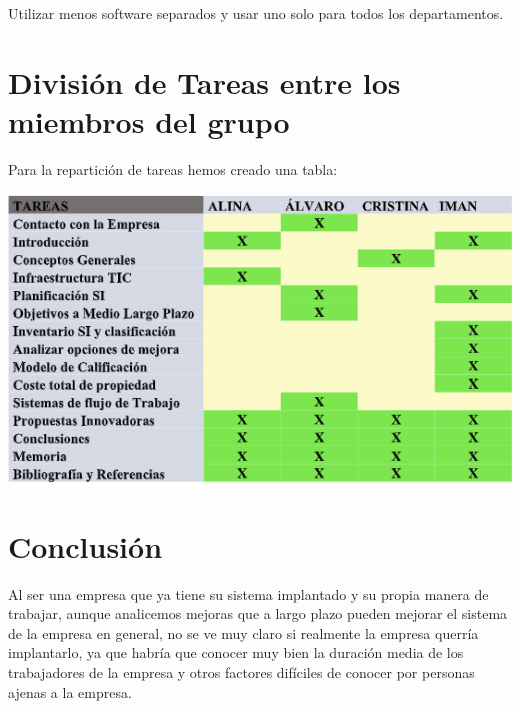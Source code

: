 \documentclass{article}
\begin{document}
Utilizar menos software separados y usar uno solo para todos los departamentos.

\section{División de Tareas entre los miembros del grupo}

Para la repartición de tareas hemos creado una tabla:

\begin{center}
\includegraphics[scale=0.5]{images/tareas.png}
\end{center}

\section{Conclusión}

Al ser una empresa que ya tiene su sistema implantado y su propia manera de
trabajar, aunque analicemos mejoras que a largo plazo pueden mejorar el sistema
de la empresa en general, no se ve muy claro si realmente la empresa querría
implantarlo, ya que habría que conocer muy bien la duración media de los
trabajadores de la empresa y otros factores difíciles de conocer por personas
ajenas a la empresa.
\end{document}
